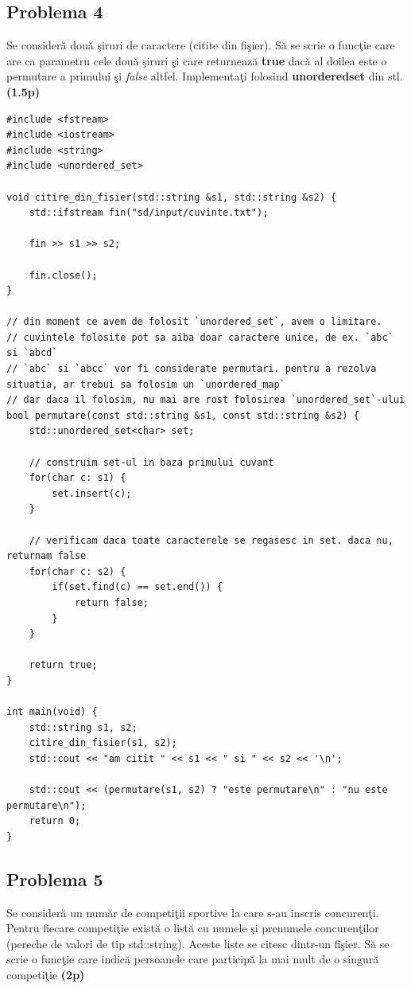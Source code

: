 \documentclass[12pt]{article}
\begin{document}
\newpage

\subsection{Problema 4}
Se consideră două şiruri de caractere (citite din fişier). Să se scrie o funcţie care are ca parametru cele două şiruri şi care returnează \textbf{true} dacă al doilea este o permutare a primului şi \textit{false} altfel. Implementaţi folosind \textbf{unordered\textunderscore set} din stl.
\textbf{(1.5p)}\newline

\begin{lstlisting}
#include <fstream>
#include <iostream>
#include <string>
#include <unordered_set>

void citire_din_fisier(std::string &s1, std::string &s2) {
    std::ifstream fin("sd/input/cuvinte.txt");

    fin >> s1 >> s2;

    fin.close();
}

// din moment ce avem de folosit `unordered_set`, avem o limitare. 
// cuvintele folosite pot sa aiba doar caractere unice, de ex. `abc` si `abcd`
// `abc` si `abcc` vor fi considerate permutari. pentru a rezolva situatia, ar trebui sa folosim un `unordered_map`
// dar daca il folosim, nu mai are rost folosirea `unordered_set`-ului
bool permutare(const std::string &s1, const std::string &s2) {
    std::unordered_set<char> set;

    // construim set-ul in baza primului cuvant
    for(char c: s1) {
        set.insert(c);
    }

    // verificam daca toate caracterele se regasesc in set. daca nu, returnam false
    for(char c: s2) {
        if(set.find(c) == set.end()) {
            return false;
        }
    }

    return true;
}

int main(void) {
    std::string s1, s2;
    citire_din_fisier(s1, s2);
    std::cout << "am citit " << s1 << " si " << s2 << '\n';

    std::cout << (permutare(s1, s2) ? "este permutare\n" : "nu este permutare\n");
    return 0;
}
\end{lstlisting}

\newpage

\subsection{Problema 5}
Se consideră un număr de competiţii sportive la care s-au inscris concurenţi. Pentru fiecare competiţie există o listă cu numele şi prenumele concurenţilor (pereche de valori de tip std::string). Aceste liste se citesc dintr-un fişier. Să se scrie o funcţie care indică persoanele care participă la mai mult de o singură competiţie
\textbf{(2p)}\newline
\end{document}
